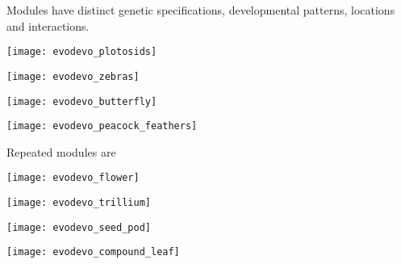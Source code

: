 \documentclass[t]{beamer}
\begin{document}
\begin{frame}{Modules have distinct genetic specifications, developmental patterns, locations and interactions.}
\vspace{-\baselineskip}

\begin{multicols}{2}

\centering

\texttt{[image: evodevo\_plotosids]}

\vspace{0.5ex}

\noindent\texttt{[image: evodevo\_zebras]}

\columnbreak

\texttt{[image: evodevo\_butterfly]}

\vspace{0.5ex}

\texttt{[image: evodevo\_peacock\_feathers]}

\end{multicols}
	
\end{frame}


\begin{frame}{Repeated modules are }

\vspace{-\baselineskip}

\begin{multicols}{2}

\centering

\texttt{[image: evodevo\_flower]}

\vspace{0.5ex}

\noindent\texttt{[image: evodevo\_trillium]}

\columnbreak

\texttt{[image: evodevo\_seed\_pod]}

\vspace{0.5ex}

\texttt{[image: evodevo\_compound\_leaf]}

\end{multicols}
	
\end{frame}

\end{document}
